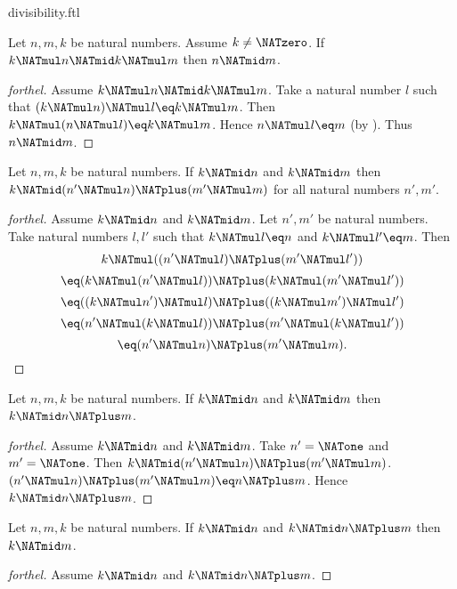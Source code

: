 \documentclass{stex}
\begin{document}
\begin{smodule}{divisibility.ftl}
\begin{proposition}[forthel,id=ARITHMETIC_07_6469492028735488]
  Let $n, m, k$ be natural numbers.
  Assume $k \neq \NATzero$.
  If $k \NATmul n \NATmid k \NATmul m$ then $n \NATmid m$.
\end{proposition}
\begin{proof}[forthel]
  Assume $k \NATmul n \NATmid k \NATmul m$.
  Take a natural number $l$ such that $(k \NATmul n) \NATmul l \eq k \NATmul m$.
  Then $k \NATmul (n \NATmul l) \eq k \NATmul m$.
  Hence $n \NATmul l \eq m$ (by ).
  Thus $n \NATmid m$.
\end{proof}

\begin{proposition}[forthel,id=ARITHMETIC_07_4700711333920768]
  Let $n, m, k$ be natural numbers.
  If $k \NATmid n$ and $k \NATmid m$ then $k \NATmid (n' \NATmul n) \NATplus (m' \NATmul m)$
  for all natural numbers $n', m'$.
\end{proposition}
\begin{proof}[forthel]
  Assume $k \NATmid n$ and $k \NATmid m$.
  Let $n', m'$ be natural numbers.
  Take natural numbers $l,l'$ such that $k \NATmul l \eq n$ and $k \NATmul l' \eq m$.
  Then
  \[  k \NATmul ((n' \NATmul l) \NATplus (m' \NATmul l'))                \]
  \[    \eq (k \NATmul (n' \NATmul l)) \NATplus (k \NATmul (m' \NATmul l'))  \]
  \[    \eq ((k \NATmul n') \NATmul l) \NATplus ((k \NATmul m') \NATmul l')  \]
  \[    \eq (n' \NATmul (k \NATmul l)) \NATplus (m' \NATmul (k \NATmul l'))  \]
  \[    \eq (n' \NATmul n) \NATplus (m' \NATmul m).                      \]
\end{proof}

\begin{corollary}[forthel,id=ARITHMETIC_07_1556786209357824]
  Let $n, m, k$ be natural numbers.
  If $k \NATmid n$ and $k \NATmid m$ then $k \NATmid n \NATplus m$.
\end{corollary}
\begin{proof}[forthel]
  Assume $k \NATmid n$ and $k \NATmid m$.
  Take $n' = \NATone$ and $m' = \NATone$.
  Then $k \NATmid (n' \NATmul n) \NATplus (m' \NATmul m)$.
  $(n' \NATmul n) \NATplus (m' \NATmul m) \eq n \NATplus m$.
  Hence $k \NATmid n \NATplus m$.
\end{proof}

\begin{proposition}[forthel,id=ARITHMETIC_07_1076947887063040]
  Let $n, m, k$ be natural numbers.
  If $k \NATmid n$ and $k \NATmid n \NATplus m$ then $k \NATmid m$.
\end{proposition}
\begin{proof}[forthel]
  Assume $k \NATmid n$ and $k \NATmid n \NATplus m$.


\end{proof}
\end{smodule}
\end{document}
